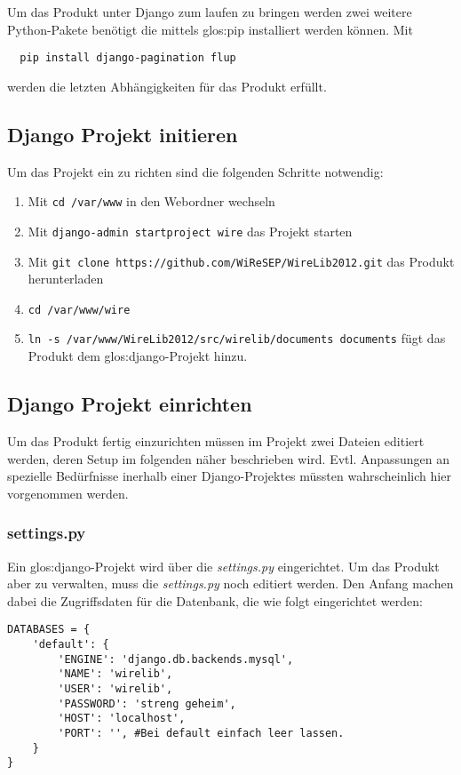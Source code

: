 Um das Produkt unter Django zum laufen zu bringen werden zwei weitere
Python-Pakete benötigt die mittels \Gls{glos:pip} installiert werden können.
Mit 
\begin{lstlisting}
  pip install django-pagination flup
\end{lstlisting}
werden die letzten Abhängigkeiten für das Produkt erfüllt.

\subsection{Django Projekt initieren}

Um das Projekt ein zu richten sind die folgenden Schritte notwendig:
\begin{enumerate}
  \item Mit \lstinline{cd /var/www} in den Webordner wechseln
  \item Mit \lstinline{django-admin startproject wire} das Projekt starten
  \item Mit \lstinline{git clone https://github.com/WiReSEP/WireLib2012.git}
	das Produkt herunterladen
  \item \lstinline{cd /var/www/wire}
  \item \lstinline{ln -s /var/www/WireLib2012/src/wirelib/documents documents}
	fügt das Produkt dem \Gls{glos:django}-Projekt hinzu.
\end{enumerate}

\subsection{Django Projekt einrichten}
Um das Produkt fertig einzurichten müssen im Projekt zwei Dateien editiert
werden, deren Setup im folgenden näher beschrieben wird. Evtl. Anpassungen an
spezielle Bedürfnisse inerhalb einer Django-Projektes müssten wahrscheinlich
hier vorgenommen werden.

\subsubsection{settings.py}
Ein \Gls{glos:django}-Projekt wird über die \emph{settings.py} eingerichtet.
Um das Produkt aber zu verwalten, muss die \emph{settings.py} noch editiert
werden. Den Anfang machen dabei die Zugriffsdaten für die Datenbank, die wie
folgt eingerichtet werden:


\begin{lstlisting}
DATABASES = {
    'default': {
        'ENGINE': 'django.db.backends.mysql',
        'NAME': 'wirelib',
        'USER': 'wirelib', 
        'PASSWORD': 'streng geheim',
        'HOST': 'localhost',
        'PORT': '', #Bei default einfach leer lassen.
    }
}
\end{lstlisting}

